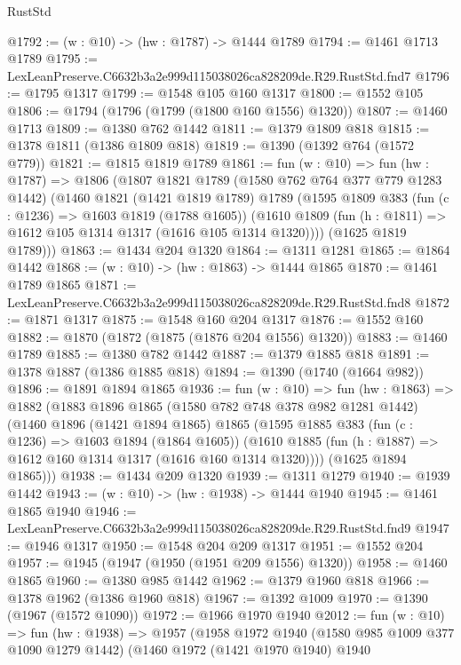 \begin{lexlean}{RustStd}
\begin{coremodule}
@1792 := (w : @10) -> (hw : @1787) -> @1444 @1789
@1794 := @1461 @1713 @1789
@1795 := LexLeanPreserve.C6632b3a2e999d115038026ca828209de.R29.RustStd.fnd7
@1796 := @1795 @1317
@1799 := @1548 @105 @160 @1317
@1800 := @1552 @105
@1806 := @1794 (@1796 (@1799 (@1800 @160 @1556) @1320))
@1807 := @1460 @1713
@1809 := @1380 @762 @1442
@1811 := @1379 @1809 @818
@1815 := @1378 @1811 (@1386 @1809 @818)
@1819 := @1390 (@1392 @764 (@1572 @779))
@1821 := @1815 @1819 @1789
@1861 := fun (w : @10) =>
  fun (hw : @1787) =>
  @1806
    (@1807
      @1821
      @1789
      (@1580 @762 @764 @377 @779 @1283 @1442)
      (@1460
        @1821
        (@1421 @1819 @1789)
        @1789
        (@1595
          @1809
          @383
          (fun (c : @1236) => @1603 @1819 (@1788 @1605))
          (@1610 @1809 (fun (h : @1811) => @1612 @105 @1314 @1317 (@1616 @105 @1314 @1320))))
        (@1625 @1819 @1789)))
@1863 := @1434 @204 @1320
@1864 := @1311 @1281
@1865 := @1864 @1442
@1868 := (w : @10) -> (hw : @1863) -> @1444 @1865
@1870 := @1461 @1789 @1865
@1871 := LexLeanPreserve.C6632b3a2e999d115038026ca828209de.R29.RustStd.fnd8
@1872 := @1871 @1317
@1875 := @1548 @160 @204 @1317
@1876 := @1552 @160
@1882 := @1870 (@1872 (@1875 (@1876 @204 @1556) @1320))
@1883 := @1460 @1789
@1885 := @1380 @782 @1442
@1887 := @1379 @1885 @818
@1891 := @1378 @1887 (@1386 @1885 @818)
@1894 := @1390 (@1740 (@1664 @982))
@1896 := @1891 @1894 @1865
@1936 := fun (w : @10) =>
  fun (hw : @1863) =>
  @1882
    (@1883
      @1896
      @1865
      (@1580 @782 @748 @378 @982 @1281 @1442)
      (@1460
        @1896
        (@1421 @1894 @1865)
        @1865
        (@1595
          @1885
          @383
          (fun (c : @1236) => @1603 @1894 (@1864 @1605))
          (@1610 @1885 (fun (h : @1887) => @1612 @160 @1314 @1317 (@1616 @160 @1314 @1320))))
        (@1625 @1894 @1865)))
@1938 := @1434 @209 @1320
@1939 := @1311 @1279
@1940 := @1939 @1442
@1943 := (w : @10) -> (hw : @1938) -> @1444 @1940
@1945 := @1461 @1865 @1940
@1946 := LexLeanPreserve.C6632b3a2e999d115038026ca828209de.R29.RustStd.fnd9
@1947 := @1946 @1317
@1950 := @1548 @204 @209 @1317
@1951 := @1552 @204
@1957 := @1945 (@1947 (@1950 (@1951 @209 @1556) @1320))
@1958 := @1460 @1865
@1960 := @1380 @985 @1442
@1962 := @1379 @1960 @818
@1966 := @1378 @1962 (@1386 @1960 @818)
@1967 := @1392 @1009
@1970 := @1390 (@1967 (@1572 @1090))
@1972 := @1966 @1970 @1940
@2012 := fun (w : @10) =>
  fun (hw : @1938) =>
  @1957
    (@1958
      @1972
      @1940
      (@1580 @985 @1009 @377 @1090 @1279 @1442)
      (@1460
        @1972
        (@1421 @1970 @1940)
        @1940

\end{coremodule}
\end{lexlean}
